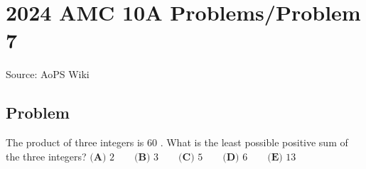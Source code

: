 \documentclass[12pt]{article}
\begin{document}
\section*{{2024 AMC 10A Problems/Problem 7}}
Source: AoPS Wiki

\subsection*{Problem}
The product of three integers is $60$ . What is the least possible positive sum of the
three integers? $\textbf{(A) }2\qquad\textbf{(B) }3\qquad\textbf{(C) }5\qquad\textbf{(D) }6\qquad\textbf{(E) }13$
\end{document}
